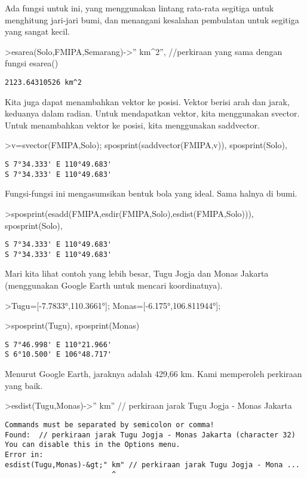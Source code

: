 \documentclass[
]{book}
\begin{document}
Ada fungsi untuk ini, yang menggunakan lintang rata-rata segitiga untuk menghitung jari-jari bumi, dan menangani kesalahan pembulatan untuk segitiga yang sangat kecil.

\textgreater esarea(Solo,FMIPA,Semarang)-\textgreater'' km\^{}2'', //perkiraan yang sama dengan fungsi esarea()

\begin{verbatim}
2123.64310526 km^2
\end{verbatim}

Kita juga dapat menambahkan vektor ke posisi. Vektor berisi arah dan jarak, keduanya dalam radian. Untuk mendapatkan vektor, kita menggunakan svector. Untuk menambahkan vektor ke posisi, kita menggunakan saddvector.

\textgreater v=svector(FMIPA,Solo); sposprint(saddvector(FMIPA,v)), sposprint(Solo),

\begin{verbatim}
S 7°34.333' E 110°49.683'
S 7°34.333' E 110°49.683'
\end{verbatim}

Fungsi-fungsi ini mengasumsikan bentuk bola yang ideal. Sama halnya di bumi.

\textgreater sposprint(esadd(FMIPA,esdir(FMIPA,Solo),esdist(FMIPA,Solo))), sposprint(Solo),

\begin{verbatim}
S 7°34.333' E 110°49.683'
S 7°34.333' E 110°49.683'
\end{verbatim}

Mari kita lihat contoh yang lebih besar, Tugu Jogja dan Monas Jakarta (menggunakan Google Earth untuk mencari koordinatnya).

\textgreater Tugu={[}-7.7833°,110.3661°{]}; Monas={[}-6.175°,106.811944°{]};

\textgreater sposprint(Tugu), sposprint(Monas)

\begin{verbatim}
S 7°46.998' E 110°21.966'
S 6°10.500' E 106°48.717'
\end{verbatim}

Menurut Google Earth, jaraknya adalah 429,66 km. Kami memperoleh perkiraan yang baik.

\textgreater esdist(Tugu,Monas)-\textgreater'' km'' // perkiraan jarak Tugu Jogja - Monas Jakarta

\begin{verbatim}
Commands must be separated by semicolon or comma!
Found:  // perkiraan jarak Tugu Jogja - Monas Jakarta (character 32)
You can disable this in the Options menu.
Error in:
esdist(Tugu,Monas)-&gt;" km" // perkiraan jarak Tugu Jogja - Mona ...
                         ^
\end{verbatim}
\end{document}
